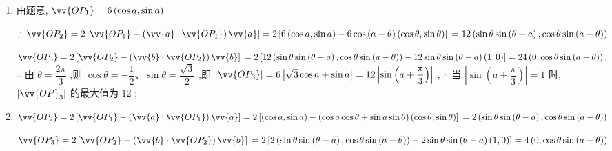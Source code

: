 \begin{enumerate}
\begin{jieda}
\begin{enumerate}
        \item 由题意, $\vv{O{P}_{1}} = 6\left( {\cos a,\sin a}\right)$ 
        
        $\therefore \vv{O{P}_{2}} = 2\left\lbrack  {\vv{O{P}_{1}} - \left( {\vv{a} \cdot  \vv{O{P}_{1}}}\right) \vv{a}}\right\rbrack   = 2\left\lbrack  {6\left( {\cos a,\sin a}\right)  - 6\cos \left( {a - \theta }\right) \left( {\cos \theta ,\sin \theta }\right) }\right\rbrack   \\
        = {12}\left( {\sin \theta \sin \left( {\theta  - a}\right) ,\cos \theta \sin \left( {a - \theta }\right) }\right)$
        
        $\vv{O{P}_{3}} = 2\left\lbrack  {\vv{O{P}_{2}} - \left( {\vv{b} \cdot  \vv{O{P}_{2}}}\right) \vv{b}}\right\rbrack   \\
        = 2\left\lbrack  {{12}\left( {\sin \theta \sin \left( {\theta  - a}\right) ,\cos \theta \sin \left( {a - \theta }\right) }\right)  - {12}\sin \theta \sin \left( {\theta  - a}\right) \left( {1,0}\right) }\right\rbrack   = {24}\left( {0,\cos \theta \sin \left( {a - \theta }\right) }\right) ,$
        $\therefore$ 由 $\theta  = \dfrac{2\pi }{3}$ ,则 $\cos \theta  =  - \dfrac{1}{2}\text{、}\sin \theta  = \dfrac{\sqrt{3}}{2}$ ,即 $\left| \vv{O{P}_{3}}\right|  = 6\left| {\sqrt{3}\cos a + \sin a}\right|  = {12}\left| {\sin \left( {a + \dfrac{\pi }{3}}\right) }\right|$ ,
        $\therefore$ 当 $\left| {\sin \left( {a + \dfrac{\pi }{3}}\right) }\right|  = 1$ 时, $\left| {\vv{OP}}_{3}\right|$ 的最大值为 12 ;
        
        \item $\vv{O{P}_{2}} = 2\left\lbrack  {\vv{O{P}_{1}} - \left( {\vv{a} \cdot  \vv{O{P}_{1}}}\right) \vv{a}}\right\rbrack   = 2\left\lbrack  {\left( {\cos a,\sin a}\right)  - \left( {\cos a\cos \theta  + \sin a\sin \theta }\right) \left( {\cos \theta ,\sin \theta }\right) }\right\rbrack   \\
        = 2\left( {\sin \theta \sin \left( {\theta  - a}\right) ,\cos \theta \sin \left( {a - \theta }\right) }\right)$
        
        $\vv{O{P}_{3}} = 2\left\lbrack  {\vv{O{P}_{2}} - \left( {\vv{b} \cdot  \vv{O{P}_{2}}}\right) \vv{b}}\right\rbrack   \\
        = 2\left\lbrack  {2\left( {\sin \theta \sin \left( {\theta  - a}\right) ,\cos \theta \sin \left( {a - \theta }\right) }\right)  - 2\sin \theta \sin \left( {\theta  - a}\right) \left( {1,0}\right) }\right\rbrack   = 4\left( {0,\cos \theta \sin \left( {a - \theta }\right) }\right) $
        

\end{enumerate}
\end{jieda}
\end{enumerate}
